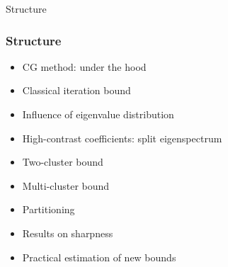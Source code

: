 \begin{frame}[label=toc]{Structure}
    \frametitle{Structure}
    \begin{itemize}
        \item CG method: under the hood
        \item Classical iteration bound
        \item Influence of eigenvalue distribution
        \item High-contrast coefficients: split eigenspectrum
        \item Two-cluster bound
        \item Multi-cluster bound
        \item Partitioning
        \item Results on sharpness
        \item Practical estimation of new bounds
    \end{itemize}
\end{frame}

\begin{comment}
Level 1: Discretisation & intro CG
    - FEM discretization $\Omega\rightarrow\mathcal{T}$, $\nabla \rightarrow A$, $u\rightarrow\mathbf{u}$, $f\rightarrow\mathbf{b}$
    - Linear system of equations $A\mathbf{u}=\mathbf{b}$
    - CG takes in initial guess $\mathbf{u}_0$ and provides updated solution $\mathbf{u}_k$ after $k$ iterations.
    - Classical bound given relative error tolerance $\epsilon_m = \frac{\|\mathbf{e}_m\|_A}{\|\mathbf{e}_0\|_A} \leq \epsilon$ is 
    $\epsilon_m \leq 2\left(\frac{\sqrt{\kappa} - 1}{\sqrt{\kappa} + 1}\right)^{m} \longrightarrow m \leq \left\lfloor\frac{\sqrt{\kappa}}{2}\ln\left(\frac{2}{\epsilon}\right) + 1\right\rfloor = m_1$
    - However $m_1$ can be too pessimistic for high-contrast problems.That is, $m \ll m_1$
    - Restate R.Q.: "How do we improve/sharpen the classical bound $m_1$ for model problem?"
Level 2: CG convergence in detail
    - Spectrum $\sigma(A) = \{\lambda_1, \ldots, \lambda_n\}$ and $\kappa(A) = \frac{\lambda_{\max}}{\lambda_{\min}}$
    - CG solution given as $\mathbf{u}_m = \mathbf{u}_0 + q(A)\mathbf{r}_0$, with polynomial $q$ being the \textit{solution polynomial}.
    - CG residual polynomial $r(\lambda) = 1 - \lambda q(\lambda)$
    - Error expression $\epsilon_m = \frac{\|\mathbf{e}_m\|_A}{\|\mathbf{e}_0\|_A} < \min_{r \in \mathcal{P}_{m-1}, r(0) = 1} \max_{\lambda \in \sigma(A)} |r(\lambda)|$
    - Animation: cg_residual_poly 
        - Loop through different randomized, clustered spectra, showing r_m for each. 
        - Show best and worst case scenario's for CG convergence
    - Restate R.Q.: "How can we find a sharpened CG iteration bound that accounts for the influence of the eigenvalue distribution?"
Level 3: Two cluster case (Axelsson)

\end{comment}